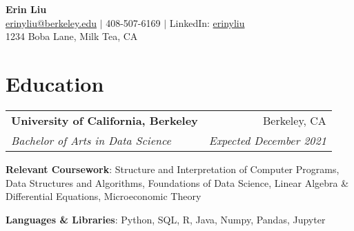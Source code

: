 \documentclass[letterpaper,11pt]{article}
\makeatletter
\newcommand{\resumeItemNoBullet}[2]{
  \item[]\small{
    \hspace{-9pt}\textbf{#1}{: #2 \vspace{-6pt}}
  }
}
\newcommand{\resumeSubheading}[4]{
  \vspace{-1pt}\item[]
  \begin{tabular*}{0.98\textwidth}{l@{\extracolsep{\fill}}r}
      \hspace{-10pt}\textbf{#1} & #2 \\
      \hspace{-10pt}\textit{\small#3} & \textit{\small #4} \\
    \end{tabular*}\vspace{-5pt}
}
\newcommand{\resumeSubHeadingListStart}{\begin{itemize}[leftmargin=*]}
\newcommand{\resumeSubHeadingListEnd}{\end{itemize}}
\newcommand{\shorterSection}[1]{\vspace{-10pt}\section{#1}}
\makeatother
\begin{document}
\begin{center}
  \small \textbf{{\huge Erin Liu}} \\
  \vspace{5pt}
  \href{mailto:erinyliu@berkeley.edu}{{erinyliu@berkeley.edu}} $\vert$
  408-507-6169 $\vert$
  LinkedIn: \href{https://www.linkedin.com/in/erinyliu/}{{erinyliu}} \\
  \vspace{5pt}
  \small 1234 Boba Lane, Milk Tea, CA
\end{center}

\shorterSection{Education}
  \resumeSubHeadingListStart
    \resumeSubheading
      {University of California, Berkeley}{Berkeley, CA}
      {Bachelor of Arts in Data Science}{Expected December 2021}{
      \resumeItemNoBullet{Relevant Coursework}{Structure and Interpretation of Computer Programs, Data Structures and Algorithms, Foundations of Data Science, Linear Algebra \& Differential Equations, Microeconomic Theory}
      \resumeItemNoBullet{Languages \& Libraries}{Python, SQL, R, Java, Numpy, Pandas, Jupyter}
    }
    \resumeSubHeadingListEnd
\end{document}
